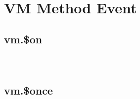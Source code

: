 \begin{lstlisting}[language=JavaScript]

\end{lstlisting}




\section{VM Method Event}


\subsection{vm.\$on}








\begin{lstlisting}[language=JavaScript]

\end{lstlisting}




\begin{lstlisting}[language=JavaScript]

\end{lstlisting}




\begin{lstlisting}[language=JavaScript]

\end{lstlisting}



\subsection{vm.\$once}








\begin{lstlisting}[language=JavaScript]

\end{lstlisting}




\begin{lstlisting}[language=JavaScript]

\end{lstlisting}




\begin{lstlisting}[language=JavaScript]

\end{lstlisting}




